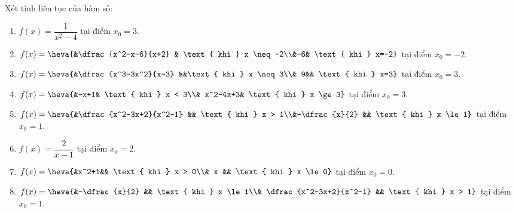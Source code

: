 \begin{ex}%
	Xét tính liên  tục của hàm số:
	\begin{enumerate}
		\item[a)] $f(x)=\dfrac{1}{x^2-4}$ tại điểm  $x_0=3$.
		\item[b)] $f(x)=\heva{&\dfrac{x^2-x-6}{x+2} & \text{  khi } x \neq-2\\&-6& \text{ khi } x=-2}$ tại điểm $x_0=-2$.
		\item[c)] $f(x)=\heva{&\dfrac{x^3-3x^2}{x-3} &&\text{ khi  } x \neq 3\\&
		 9&& \text{ khi } x=3}$ tại điểm $x_0=3$.
		 \item[d)] $f(x)=\heva{&-x+1& \text{ khi } x < 3\\&
		 x^2-4x+3& \text{ khi } x \ge 3}$ tại điểm $x_0=3$.
		\item[e)] $f(x)=\heva{&\dfrac{x^2-3x+2}{x^2-1} && \text{ khi } x > 1\\&-\dfrac{x}{2} && \text{ khi } x  \le 1}$ tại điểm $x_0=1$.
		\item[f)] $f(x)=\dfrac{2}{x-1}$  tại điểm $x_0=2$.
		\item[g)] $f(x)=\heva{&x^2+1&& \text{  khi } x > 0\\&
		x && \text{ khi } x \le  0}$ tại điểm $x_0=0$.
		\item[h)] $f(x)=\heva{&-\dfrac{x}{2} &&  \text{ khi } x \le 1\\&
		\dfrac{x^2-3x+2}{x^2-1} &&  \text{ khi } x > 1}$ tại điểm $x_0=1$.
	\end{enumerate}
\end{ex}
